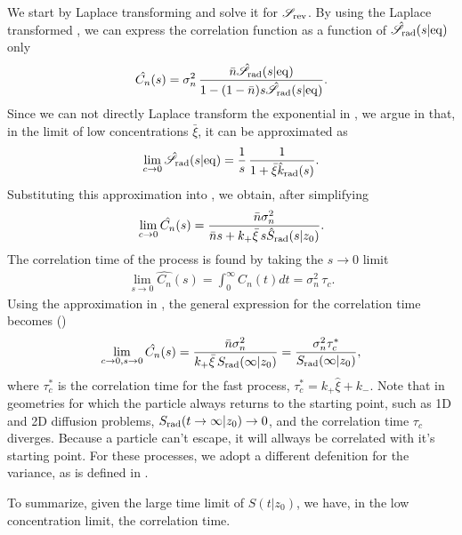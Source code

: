 We start by Laplace transforming  and solve it for $\mathscr{S}_{\rm rev}$. By using the Laplace transformed , we can express the correlation function as a function of $\hat{\mathscr{S}}_{\rm rad}(s|{\rm eq})$ only
\begin{equation}
 \hat{C_n}(s) = \sigma_n^2 \, \frac{\bar{n} \hat{\mathscr{S}}_{\rm rad}(s|{\rm eq})}{1-(1-\bar{n})s\hat{\mathscr{S}}_{\rm rad}(s|{\rm eq})}.
 \elabel{LapCorr}
\end{equation}
Since we can not directly Laplace transform the exponential in , we argue in  that, in the limit of low concentrations $\bar{\xi}$, it can be approximated as
\begin{equation}
 \lim_{c\to0} \hat{\mathscr{S}}_{\rm rad}(s|{\rm eq}) = \frac{1}{s}  \, \frac{1}{ 1 + \bar{\xi} \hat{k}_{\rm rad}(s)}.
 \elabel{Seq_approx}
\end{equation}
Substituting this approximation into , we obtain, after simplifying
\begin{equation}
 \lim_{c \to 0} \hat{C_n}(s) = \frac{\bar{n} \sigma_n^2}{\bar{n} s + k_+ \bar{\xi} \, s \hat{S}_{\rm rad}(s|z_0)}.
 \elabel{Corr_approx}
\end{equation}
The correlation time of the process is found by taking the $s \to 0$ limit
\begin{eqnarray}
 \lim_{s \to 0} \hat{C_n}(s) = \int_0^\infty C_n(t) dt = \sigma_n^2 \, \tau_c.
\end{eqnarray}
Using the approximation in , the general expression for the correlation time becomes ()
\begin{equation}
 \lim_{c \to 0, s \to 0} \hat{C_n}(s) = \frac{\bar{n} \sigma_n^2}{k_+ \bar{\xi} \, S_{\rm rad}(\infty|z_0)} = \frac{\sigma_n^2 \tau_c^*}{S_{\rm rad}(\infty|z_0)},
 \elabel{CT1}
\end{equation}
where $\tau_c^*$ is the correlation time for the fast process, $\tau_c^* = k_+ \hat{\xi} + k_-$. Note that in geometries for which the particle always returns to the starting point, such as 1D and 2D diffusion problems, $S_{\rm rad}(t\to\infty|z_0)\to0$, and the correlation time $\tau_c$ diverges. Because a particle can't escape, it will allways be correlated with it's starting point. For these processes, we adopt a different defenition for the variance, as is defined in .

To summarize, given the large time limit of $S(t|z_0)$, we have, in the low concentration limit, the correlation time.


